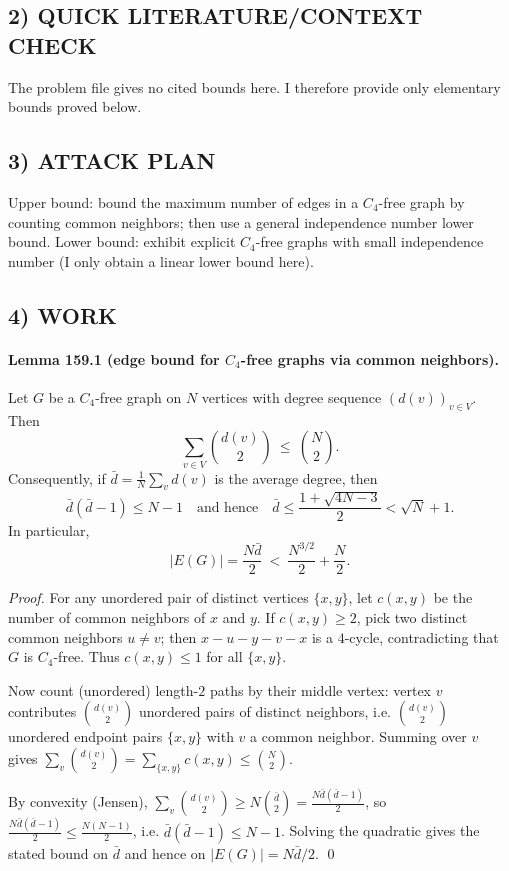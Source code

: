 \subsection*{2) QUICK LITERATURE/CONTEXT CHECK}
The problem file gives no cited bounds here. I therefore provide only elementary bounds proved below.

\subsection*{3) ATTACK PLAN}
Upper bound: bound the maximum number of edges in a $C_4$-free graph by counting common neighbors; then use a general independence number lower bound.
Lower bound: exhibit explicit $C_4$-free graphs with small independence number (I only obtain a linear lower bound here).

\subsection*{4) WORK}
\paragraph{Lemma 159.1 (edge bound for $C_4$-free graphs via common neighbors).}
Let $G$ be a $C_4$-free graph on $N$ vertices with degree sequence $(d(v))_{v\in V}$. Then
\[
\sum_{v\in V} \binom{d(v)}{2}\ \le\ \binom{N}{2}.
\]
Consequently, if $\bar d=\frac{1}{N}\sum_v d(v)$ is the average degree, then
\[
\bar d(\bar d-1)\le N-1\quad\text{and hence}\quad \bar d\le \frac{1+\sqrt{4N-3}}{2}<\sqrt N+1.
\]
In particular,
\[
|E(G)|=\frac{N\bar d}{2}\ <\ \frac{N^{3/2}}{2}+\frac{N}{2}.
\]

\textit{Proof.}
For any unordered pair of distinct vertices $\{x,y\}$, let $c(x,y)$ be the number of common neighbors of $x$ and $y$.
If $c(x,y)\ge 2$, pick two distinct common neighbors $u\neq v$; then $x-u-y-v-x$ is a $4$-cycle, contradicting that $G$ is $C_4$-free.
Thus $c(x,y)\le 1$ for all $\{x,y\}$.

Now count (unordered) length-$2$ paths by their middle vertex: vertex $v$ contributes $\binom{d(v)}{2}$ unordered pairs of distinct neighbors, i.e. $\binom{d(v)}{2}$ unordered endpoint pairs $\{x,y\}$ with $v$ a common neighbor.
Summing over $v$ gives $\sum_v \binom{d(v)}{2} = \sum_{\{x,y\}} c(x,y)\le \binom{N}{2}$.

By convexity (Jensen), $\sum_v \binom{d(v)}{2}\ge N\binom{\bar d}{2}=\frac{N\bar d(\bar d-1)}{2}$, so
$\frac{N\bar d(\bar d-1)}{2}\le \frac{N(N-1)}{2}$, i.e. $\bar d(\bar d-1)\le N-1$. Solving the quadratic gives the stated bound on $\bar d$ and hence on $|E(G)|=N\bar d/2$. \qed

